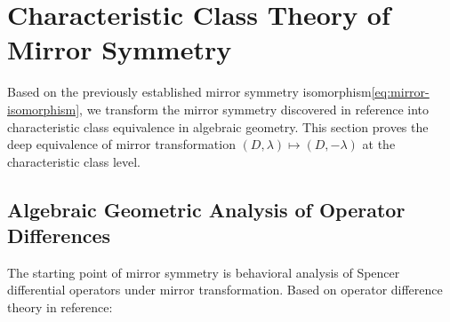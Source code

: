 \documentclass[a4paper,12pt]{extarticle}
\newtheorem{proposition}[theorem]{Proposition}
\theoremstyle{definition}
\begin{document}
\section{Characteristic Class Theory of Mirror Symmetry}

Based on the previously established mirror symmetry isomorphism\eqref{eq:mirror-isomorphism}, we transform the mirror symmetry discovered in reference\cite{zheng2025mirror} into characteristic class equivalence in algebraic geometry. This section proves the deep equivalence of mirror transformation $(D,\lambda) \mapsto (D,-\lambda)$ at the characteristic class level.

\subsection{Algebraic Geometric Analysis of Operator Differences}

The starting point of mirror symmetry is behavioral analysis of Spencer differential operators under mirror transformation. Based on operator difference theory in reference\cite{zheng2025mirror}:


\end{document}

